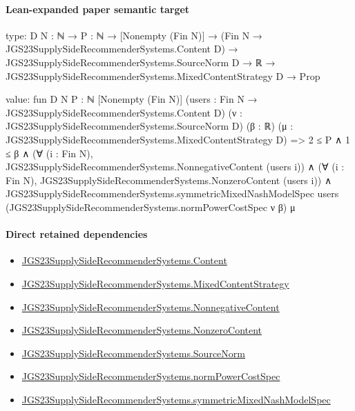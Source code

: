 \documentclass[10pt]{article}
\begin{document}
\paragraph{Lean-expanded paper semantic target}
\begin{ReviewVerbatim}
type:
{D N : ℕ} →
  {P : ℕ} →
    [Nonempty (Fin N)] →
      (Fin N → JGS23SupplySideRecommenderSystems.Content D) →
        JGS23SupplySideRecommenderSystems.SourceNorm D →
          ℝ → JGS23SupplySideRecommenderSystems.MixedContentStrategy D → Prop

value:
fun {D N P : ℕ} [Nonempty (Fin N)] (users : Fin N → JGS23SupplySideRecommenderSystems.Content D)
    (ν : JGS23SupplySideRecommenderSystems.SourceNorm D) (β : ℝ)
    (μ : JGS23SupplySideRecommenderSystems.MixedContentStrategy D) =>
  2 ≤ P ∧
    1 ≤ β ∧
      (∀ (i : Fin N), JGS23SupplySideRecommenderSystems.NonnegativeContent (users i)) ∧
        (∀ (i : Fin N), JGS23SupplySideRecommenderSystems.NonzeroContent (users i)) ∧
          JGS23SupplySideRecommenderSystems.symmetricMixedNashModelSpec users
            (JGS23SupplySideRecommenderSystems.normPowerCostSpec ν β) μ
\end{ReviewVerbatim}

\paragraph{Direct retained dependencies}
\begin{itemize}\raggedright
\item \hyperlink{governing-declaration-367305fda50f0ada}{JGS23\allowbreak{}Supply\allowbreak{}Side\allowbreak{}Recommender\allowbreak{}Systems.\allowbreak{}Content}
\item \hyperlink{governing-declaration-2089965d06cf0282}{JGS23\allowbreak{}Supply\allowbreak{}Side\allowbreak{}Recommender\allowbreak{}Systems.\allowbreak{}Mixed\allowbreak{}Content\allowbreak{}Strategy}
\item \hyperlink{governing-declaration-d426babe40b9593c}{JGS23\allowbreak{}Supply\allowbreak{}Side\allowbreak{}Recommender\allowbreak{}Systems.\allowbreak{}Nonnegative\allowbreak{}Content}
\item \hyperlink{governing-declaration-90e2ac7d13788c50}{JGS23\allowbreak{}Supply\allowbreak{}Side\allowbreak{}Recommender\allowbreak{}Systems.\allowbreak{}Nonzero\allowbreak{}Content}
\item \hyperlink{governing-declaration-6141339a5d3412d9}{JGS23\allowbreak{}Supply\allowbreak{}Side\allowbreak{}Recommender\allowbreak{}Systems.\allowbreak{}Source\allowbreak{}Norm}
\item \hyperlink{governing-declaration-6ba13dc1cae95e6e}{JGS23\allowbreak{}Supply\allowbreak{}Side\allowbreak{}Recommender\allowbreak{}Systems.\allowbreak{}norm\allowbreak{}Power\allowbreak{}Cost\allowbreak{}Spec}
\item \hyperlink{paper-prerequisite-b412efba7deb757f}{JGS23\allowbreak{}Supply\allowbreak{}Side\allowbreak{}Recommender\allowbreak{}Systems.\allowbreak{}symmetric\allowbreak{}Mixed\allowbreak{}Nash\allowbreak{}Model\allowbreak{}Spec}
\end{itemize}
\end{document}
